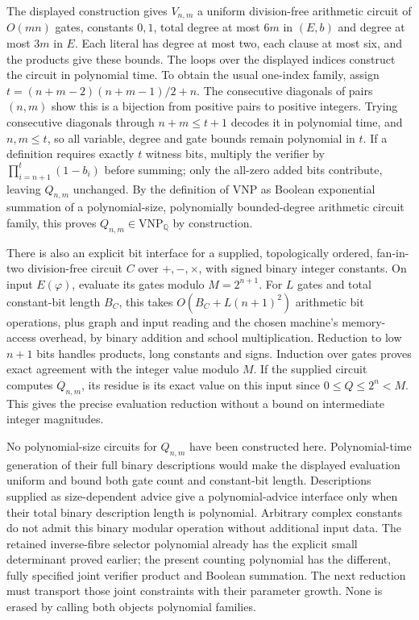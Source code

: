 The displayed construction gives $V_{n,m}$ a uniform division-free
arithmetic circuit of $O(mn)$ gates, constants $0,1$, total degree
at most $6m$ in $(E,b)$ and degree at most $3m$ in $E$.
Each literal has degree at most two, each clause at most six, and
the products give these bounds. The loops over the displayed indices
construct the circuit in polynomial time. To obtain the usual one-index
family, assign
$t=(n+m-2)(n+m-1)/2+n$. The consecutive diagonals of pairs $(n,m)$
show this is a bijection from positive pairs to positive integers.
Trying consecutive diagonals through $n+m\le t+1$ decodes it in
polynomial time, and $n,m\le t$, so all variable, degree and gate bounds
remain polynomial in $t$. If a definition requires exactly $t$ witness
bits, multiply the verifier by $\prod_{i=n+1}^{t}(1-b_i)$ before
summing; only the all-zero added bits contribute, leaving $Q_{n,m}$
unchanged. By the definition of $\mathrm{VNP}$
as Boolean exponential summation of a polynomial-size,
polynomially bounded-degree arithmetic circuit family, this proves
$Q_{n,m}\in\mathrm{VNP}_{\mathbb Q}$ by construction.

There is also an explicit bit interface for a supplied, topologically
ordered, fan-in-two division-free circuit $C$ over $+,-,\times$, with
signed binary integer constants. On input $E(\varphi)$, evaluate its gates
modulo $M=2^{n+1}$. For $L$ gates and total constant-bit length $B_C$,
this takes $O(B_C+L(n+1)^2)$ arithmetic bit operations, plus graph and
input reading and the chosen machine's memory-access overhead,
by binary addition and school multiplication. Reduction to low
$n+1$ bits handles products, long constants and signs.
Induction over gates proves exact agreement with the integer value
modulo $M$. If the supplied circuit computes $Q_{n,m}$, its residue
is its exact value on this input since $0\le Q\le2^n<M$.
This gives the precise evaluation reduction without a bound on
intermediate integer magnitudes.

No polynomial-size circuits for $Q_{n,m}$ have been constructed here.
Polynomial-time generation of their full binary descriptions would
make the displayed evaluation uniform and bound both gate count and
constant-bit length. Descriptions supplied as size-dependent advice
give a polynomial-advice interface only when their total binary
description length is polynomial.
Arbitrary complex constants do not admit this binary modular
operation without additional input data.
The retained inverse-fibre selector polynomial already has the
explicit small determinant proved earlier; the present counting
polynomial has the different, fully specified joint verifier product
and Boolean summation. The next reduction must transport those
joint constraints with their parameter growth. None is erased by
calling both objects polynomial families.
